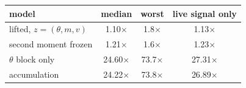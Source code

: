 \setlength{\tabcolsep}{4pt}
\begin{tabular}{@{}lccc@{}}
\toprule
model & median & worst & live signal only \\
\midrule
lifted, $z = (\theta, m, v)$ & 1.10$\times$ & 1.8$\times$ & 1.13$\times$ \\
second moment frozen & 1.21$\times$ & 1.6$\times$ & 1.23$\times$ \\
$\theta$ block only & 24.60$\times$ & 73.7$\times$ & 27.31$\times$ \\
accumulation & 24.22$\times$ & 73.8$\times$ & 26.89$\times$ \\
\bottomrule
\end{tabular}